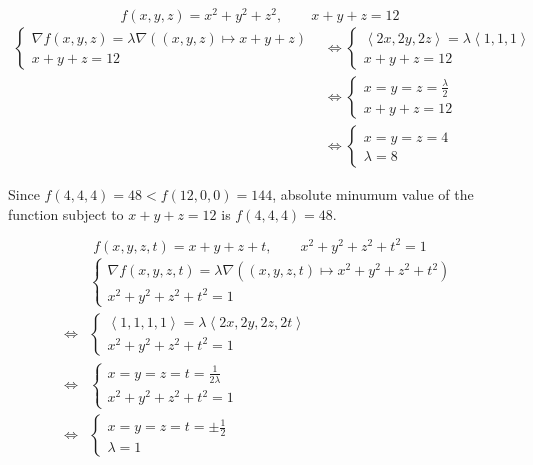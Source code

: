 \documentclass[a4paper,12pt]{article}
\begin{document}
\[f(x, y, z) = x^2 + y^2 + z^2,\qquad x + y + z = 12\tag{8}\]
\begin{align*}
  \begin{cases}
    \nabla f(x, y, z) = \lambda\nabla((x, y, z) \mapsto x + y + z)\\
    x + y + z = 12
  \end{cases}
  &\iff
  \begin{cases}
    \left<2x, 2y, 2z\right> = \lambda\left<1, 1, 1\right>\\
    x + y + z = 12
  \end{cases}\\
  &\iff
  \begin{cases}
    x = y = z = \frac{\lambda}{2}\\
    x + y + z = 12
  \end{cases}\\
  &\iff
  \begin{cases}
    x = y = z = 4\\
    \lambda = 8
  \end{cases}
\end{align*}

Since $f(4, 4, 4) = 48 < f(12, 0, 0) = 144$, absolute minumum value of the
function subject to $x + y + z = 12$ is $f(4, 4, 4) = 48$.

\[f(x, y, z, t) = x + y + z + t,\qquad x^2 + y^2 + z^2 + t^2 = 1\tag{13}\]
\begin{align*}
  &\begin{cases}
    \nabla f(x, y, z, t) = \lambda\nabla((x, y, z, t) \mapsto x^2 + y^2 + z^2 + t^2)\\
    x^2 + y^2 + z^2 + t^2 = 1
  \end{cases}\\
  \iff
  &\begin{cases}
    \left<1, 1, 1, 1\right> = \lambda\left<2x, 2y, 2z, 2t\right>\\
    x^2 + y^2 + z^2 + t^2 = 1
  \end{cases}\\
  \iff
  &\begin{cases}
    x = y = z = t = \frac{1}{2\lambda}\\
    x^2 + y^2 + z^2 + t^2 = 1
  \end{cases}\\
  \iff
  &\begin{cases}
    x = y = z = t = \pm\frac{1}{2}\\
    \lambda = 1
  \end{cases}
\end{align*}
\end{document}
